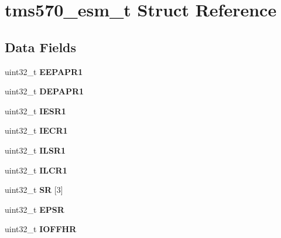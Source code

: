 \hypertarget{structtms570__esm__t}{}\section{tms570\+\_\+esm\+\_\+t Struct Reference}
\label{structtms570__esm__t}
\subsection*{Data Fields}
\begin{DoxyCompactItemize}
\item 
\mbox{\label{structtms570__esm__t_a93269af67404bd77b6b709ebd80757e4}} 
uint32\+\_\+t {\bfseries E\+E\+P\+A\+P\+R1}
\item 
\mbox{\label{structtms570__esm__t_aefe645fa256326a0c78e8f063d75cc60}} 
uint32\+\_\+t {\bfseries D\+E\+P\+A\+P\+R1}
\item 
\mbox{\label{structtms570__esm__t_a341a9b848b1b540409fb0ea9323be631}} 
uint32\+\_\+t {\bfseries I\+E\+S\+R1}
\item 
\mbox{\label{structtms570__esm__t_a7497d31100e8e5e07c7548188bfda9e5}} 
uint32\+\_\+t {\bfseries I\+E\+C\+R1}
\item 
\mbox{\label{structtms570__esm__t_a6e674bb4acb410e6c31f88387230b56c}} 
uint32\+\_\+t {\bfseries I\+L\+S\+R1}
\item 
\mbox{\label{structtms570__esm__t_ad4f9ee2dd1d9ff63f9a4dc76d7ac980b}} 
uint32\+\_\+t {\bfseries I\+L\+C\+R1}
\item 
\mbox{\label{structtms570__esm__t_aaafce7283448d12178105c118f5bb721}} 
uint32\+\_\+t {\bfseries SR} \mbox{[}3\mbox{]}
\item 
\mbox{\label{structtms570__esm__t_af5dc614985e613381da6361f1a9565b5}} 
uint32\+\_\+t {\bfseries E\+P\+SR}
\item 
\mbox{\label{structtms570__esm__t_a974e113b24e16d8420c1c18554244428}} 
uint32\+\_\+t {\bfseries I\+O\+F\+F\+HR}

\end{DoxyCompactItemize}
